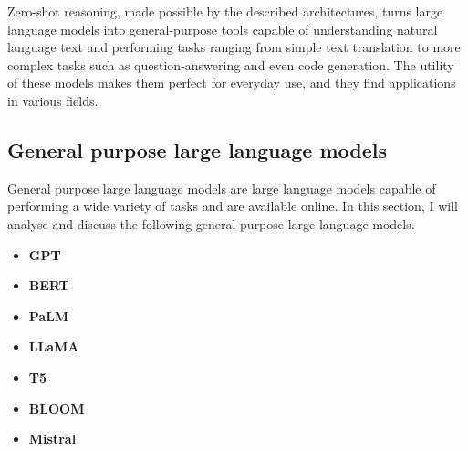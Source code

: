 Zero-shot reasoning, made possible by the described architectures, turns large language models into general-purpose tools capable of understanding natural language text and performing tasks ranging from simple text translation to more complex tasks such as question-answering and even code generation. The utility of these models makes them perfect for everyday use, and they find applications in various fields. 

\newpage
\subsection{General purpose large language models}
General purpose large language models are large language models capable of performing a wide variety of tasks and are available online. In this section, I will analyse and discuss the following general purpose large language models.
\begin{itemize}
    \item \textbf{GPT}
    \item \textbf{BERT}

    \item \textbf{PaLM}

    \item \textbf{LLaMA}

    \item \textbf{T5}
    
    \item \textbf{BLOOM}

    \item \textbf{Mistral}
\end{itemize}


